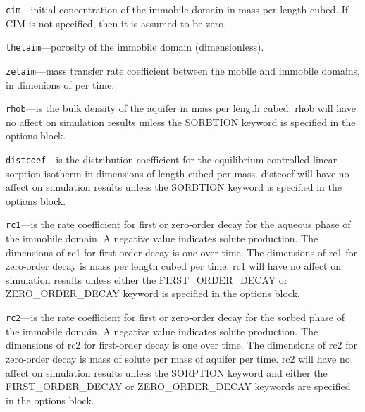 \begin{description}
\item \texttt{cim}---initial concentration of the immobile domain in mass per length cubed.  If CIM is not specified, then it is assumed to be zero.

\item \texttt{thetaim}---porosity of the immobile domain (dimensionless).

\item \texttt{zetaim}---mass transfer rate coefficient between the mobile and immobile domains, in dimenions of per time.

\item \texttt{rhob}---is the bulk density of the aquifer in mass per length cubed.  rhob will have no affect on simulation results unless the SORBTION keyword is specified in the options block.

\item \texttt{distcoef}---is the distribution coefficient for the equilibrium-controlled linear sorption isotherm in dimensions of length cubed per mass.  distcoef will have no affect on simulation results unless the SORBTION keyword is specified in the options block.

\item \texttt{rc1}---is the rate coefficient for first or zero-order decay for the aqueous phase of the immobile domain.  A negative value indicates solute production.  The dimensions of rc1 for first-order decay is one over time.  The dimensions of rc1 for zero-order decay is mass per length cubed per time.  rc1 will have no affect on simulation results unless either the FIRST_ORDER_DECAY or ZERO_ORDER_DECAY keyword is specified in the options block.

\item \texttt{rc2}---is the rate coefficient for first or zero-order decay for the sorbed phase of the immobile domain.  A negative value indicates solute production.  The dimensions of rc2 for first-order decay is one over time.  The dimensions of rc2 for zero-order decay is mass of solute per mass of aquifer per time.  rc2 will have no affect on simulation results unless the SORPTION keyword and either the FIRST_ORDER_DECAY or ZERO_ORDER_DECAY keywords are specified in the options block.

\end{description}

